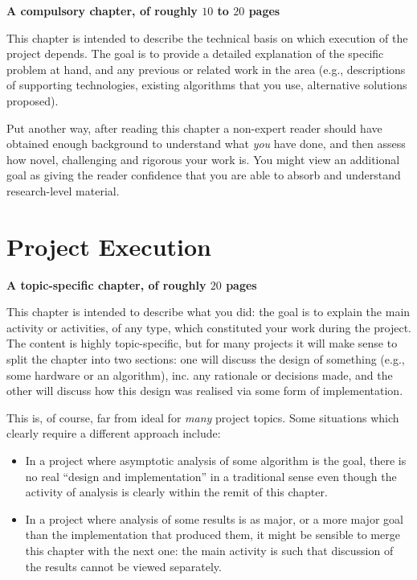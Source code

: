 \documentclass[ %
                    author={Luke Murray},
                supervisor={Dr. Simon Hollis},
                     title={Shadow Peer-to-Peer Networks},
                  subtitle={},
                    degree={MEng},
                      year={2013} ]{thesis}
\begin{document}
{\bf A compulsory chapter, of roughly $10$ to $20$ pages} 
\vspace{1cm} 

\noindent
This chapter is intended to describe the technical basis on which execution
of the project depends.  The goal is to provide a detailed explanation of
the specific problem at hand, and any previous or related work in the area 
(e.g., descriptions of supporting technologies, existing algorithms that 
you use, alternative solutions proposed).  

Put another way, after reading this chapter a non-expert reader should have 
obtained enough background to understand what {\em you} have done, and then
assess how novel, challenging and rigorous your work is.  You might view an 
additional goal as giving the reader confidence that you are able to absorb 
and understand research-level material.


\chapter{Project Execution}
\label{chap:execution}

{\bf A topic-specific chapter, of roughly $20$ pages} 
\vspace{1cm} 

\noindent
This chapter is intended to describe what you did: the goal is to explain
the main activity or activities, of any type, which constituted your work 
during the project.  The content is highly topic-specific, but for many 
projects it will make sense to split the chapter into two sections: one 
will discuss the design of something (e.g., some hardware or an algorithm), 
inc. any rationale or decisions made, and the other will discuss how this 
design was realised via some form of implementation.  

This is, of course, far from ideal for {\em many} project topics.  Some
situations which clearly require a different approach include:

\begin{itemize}
\item In a project where asymptotic analysis of some algorithm is the goal,
      there is no real ``design and implementation'' in a traditional sense
      even though the activity of analysis is clearly within the remit of
      this chapter.
\item In a project where analysis of some results is as major, or a more
      major goal than the implementation that produced them, it might be
      sensible to merge this chapter with the next one: the main activity 
      is such that discussion of the results cannot be viewed separately.
\end{itemize}
\end{document}
